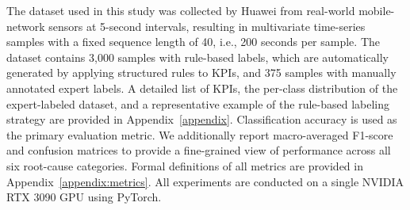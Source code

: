 \documentclass[lettersize,journal]{IEEEtran}
\begin{document}
The dataset used in this study was collected by Huawei from real-world mobile-network sensors at 5-second intervals, resulting in multivariate time-series samples with a fixed sequence length of 40, i.e., 200 seconds per sample. The dataset contains {\color{R3color}3,000} samples with rule-based labels, which are automatically generated by applying structured rules to KPIs, and {\color{R3color}375} samples with manually annotated expert labels.
A detailed list of KPIs, the per-class distribution of the expert-labeled dataset, and a representative example of the rule-based labeling strategy are provided in Appendix~\ref{appendix}.
Classification accuracy is used as the primary evaluation metric. {\color{AEcolor}We additionally report macro-averaged F1-score and confusion matrices to provide a fine-grained view of performance across all six root-cause categories. Formal definitions of all metrics are provided in Appendix~\ref{appendix:metrics}.}
{\color{R3color}
All experiments are conducted on a single NVIDIA RTX 3090 GPU using PyTorch.
}
\end{document}
